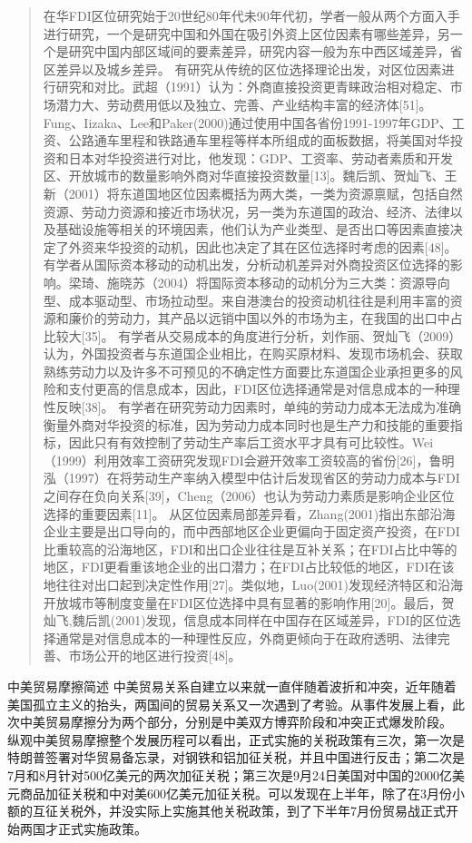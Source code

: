 \documentclass[]{article}
\begin{document}
\begin{quote}
在华FDI区位研究始于20世纪80年代未90年代初，学者一般从两个方面入手进行研究，一个是研究中国和外国在吸引外资上区位因素有哪些差异，另一个是研究中国内部区域间的要素差异，研究内容一般为东中西区域差异，省区差异以及城乡差异。
有研究从传统的区位选择理论出发，对区位因素进行研究和对比。武超（1991）认为：外商直接投资更青睐政治相对稳定、市场潜力大、劳动费用低以及独立、完善、产业结构丰富的经济体{[}51{]}。Fung、Iizaka、Lee和Paker(2000)通过使用中国各省份1991-1997年GDP、工资、公路通车里程和铁路通车里程等样本所组成的面板数据，将美国对华投资和日本对华投资进行对比，他发现：GDP、工资率、劳动者素质和开发区、开放城市的数量影响外商对华直接投资数量{[}13{]}。魏后凯、贺灿飞、王新（2001）将东道国地区位因素概括为两大类，一类为资源禀赋，包括自然资源、劳动力资源和接近市场状况，另一类为东道国的政治、经济、法律以及基础设施等相关的环境因素，他们认为产业类型、是否出口等因素直接决定了外资来华投资的动机，因此也决定了其在区位选择时考虑的因素{[}48{]}。
有学者从国际资本移动的动机出发，分析动机差异对外商投资区位选择的影响。梁琦、施晓苏（2004）将国际资本移动的动机分为三大类：资源导向型、成本驱动型、市场拉动型。来自港澳台的投资动机往往是利用丰富的资源和廉价的劳动力，其产品以远销中国以外的市场为主，在我国的出口中占比较大{[}35{]}。
有学者从交易成本的角度进行分析，刘作丽、贺灿飞（2009）认为，外国投资者与东道国企业相比，在购买原材料、发现市场机会、获取熟练劳动力以及许多不可预见的不确定性方面要比东道国企业承担更多的风险和支付更高的信息成本，因此，FDI区位选择通常是对信息成本的一种理性反映{[}38{]}。
有学者在研究劳动力因素时，单纯的劳动力成本无法成为准确衡量外商对华投资的标准，因为劳动力成本同时也是生产力和技能的重要指标，因此只有有效控制了劳动生产率后工资水平才具有可比较性。Wei（1999）利用效率工资研究发现FDI会避开效率工资较高的省份{[}26{]}，鲁明泓（1997）在将劳动生产率纳入模型中估计后发现省区的劳动力成本与FDI之间存在负向关系{[}39{]}，Cheng（2006）也认为劳动力素质是影响企业区位选择的重要因素{[}11{]}。
从区位因素局部差异看，Zhang(2001)指出东部沿海企业主要是出口导向的，而中西部地区企业更偏向于固定资产投资，在FDI比重较高的沿海地区，FDI和出口企业往往是互补关系；在FDI占比中等的地区，FDI更看重该地企业的出口潜力；在FDI占比较低的地区，FDI在该地往往对出口起到决定性作用{[}27{]}。类似地，Luo(2001)发现经济特区和沿海开放城市等制度变量在FDI区位选择中具有显著的影响作用{[}20{]}。最后，贺灿飞,魏后凯(2001)发现，信息成本同样在中国存在区域差异，FDI的区位选择通常是对信息成本的一种理性反应，外商更倾向于在政府透明、法律完善、市场公开的地区进行投资{[}48{]}。
\end{quote}

中美贸易摩擦简述
中美贸易关系自建立以来就一直伴随着波折和冲突，近年随着美国孤立主义的抬头，两国间的贸易关系又一次遇到了考验。从事件发展上看，此次中美贸易摩擦分为两个部分，分别是中美双方博弈阶段和冲突正式爆发阶段。
纵观中美贸易摩擦整个发展历程可以看出，正式实施的关税政策有三次，第一次是特朗普签署对华贸易备忘录，对钢铁和铝加征关税，并且中国进行反击；第二次是7月和8月针对500亿美元的两次加征关税；第三次是9月24日美国对中国的2000亿美元商品加征关税和中对美600亿美元加征关税。可以发现在上半年，除了在3月份小额的互征关税外，并没实际上实施其他关税政策，到了下半年7月份贸易战正式开始两国才正式实施政策。
\end{document}
